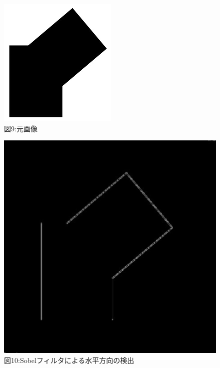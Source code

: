 ﻿\documentclass[a4j,11pt]{jarticle}
\begin{document}
\begin{figure}[tb]
 \center
 \includegraphics[width=0.7\hsize]{./eps/squares.eps}
\\ 図9:元画像\\
 \label{fig:affine1}
 \begin{minipage}{0.49\hsize} %
   \center
   \includegraphics[width=0.7\hsize]{./eps/edge-sobelx.eps}
   \\図10:Sobelフィルタによる水平方向の検出
 \end{minipage}
 \clearpage
 \begin{minipage}{0.49\hsize} %
   \center

\end{minipage}
\end{figure}
\end{document}
